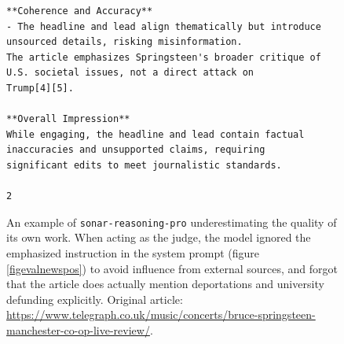\documentclass[UTF8,noindent,nohyp,parspace,titlepage,a4paper,12pt]{article}
\begin{document}
\begin{figure}[!hbtp]
\begin{lstlisting}[basicstyle=\fontsize{7pt}{8pt}\selectfont\sffamily,frame=single,linewidth=\textwidth]
**Coherence and Accuracy**
- The headline and lead align thematically but introduce unsourced details, risking misinformation.
The article emphasizes Springsteen's broader critique of U.S. societal issues, not a direct attack on
Trump[4][5].

**Overall Impression**
While engaging, the headline and lead contain factual inaccuracies and unsupported claims, requiring
significant edits to meet journalistic standards.

2
      \end{lstlisting}
      \caption{%
        An example of \texttt{sonar-reasoning-pro} underestimating the quality
        of its own work. When acting as the judge, the model ignored the
        emphasized instruction in the system prompt (figure
        \ref{figevalnewspos}) to avoid influence from external sources, and
        forgot that the article does actually mention deportations and
        university defunding explicitly. Original article:
        {\footnotesize\url{https://www.telegraph.co.uk/music/concerts/bruce-springsteen-manchester-co-op-live-review/}}.
      }
    \end{figure}
\end{document}
